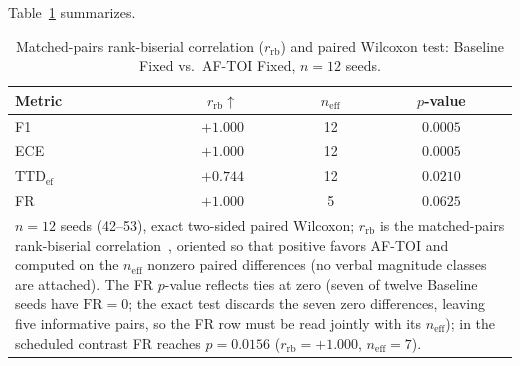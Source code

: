 \documentclass[a4paper,fleqn]{cas-dc}
\begin{document}
Table~\ref{tab:cliff_delta} summarizes.
\begin{table}[!tbp]
\centering
\caption{{\color{\revcolor}Matched-pairs rank-biserial correlation
($r_{\mathrm{rb}}$)} and paired Wilcoxon test: Baseline Fixed vs.\ \mbox{AF-TOI} Fixed{\color{\revcolor}, $n=12$ seeds}.}
\label{tab:cliff_delta}
\footnotesize
\setlength{\tabcolsep}{5pt}
\renewcommand{\arraystretch}{1.15}
{\color{\revcolor}
\begin{tabular}{l c c c}
\toprule
\textbf{Metric} & \textbf{$r_{\mathrm{rb}}$}$\uparrow$
  & \textbf{$n_{\mathrm{eff}}$} & \textbf{$p$-value} \\
\midrule
F1  & $+1.000$ & 12 & $0.0005$ \\
ECE & $+1.000$ & 12 & $0.0005$ \\
$\mathrm{TTD}_{\mathrm{ef}}$ & $+0.744$ & 12 & $0.0210$ \\
FR  & $+1.000$ & 5 & $0.0625$ \\
\bottomrule
\multicolumn{4}{p{0.94\columnwidth}}{\footnotesize $n=12$ seeds (42--53),
exact two-sided paired Wilcoxon; $r_{\mathrm{rb}}$ is the matched-pairs
rank-biserial correlation~\cite{kerby2014simple}, oriented so that positive
favors \mbox{AF-TOI} and computed on the $n_{\mathrm{eff}}$ nonzero paired
differences (no verbal magnitude classes are attached). The FR $p$-value
reflects ties at zero (seven of twelve Baseline seeds have $\mathrm{FR}=0$;
the exact test discards the seven zero differences, leaving five informative
pairs, so the FR row must be read jointly with its $n_{\mathrm{eff}}$); in
the scheduled contrast FR reaches $p=0.0156$
($r_{\mathrm{rb}}=+1.000$, $n_{\mathrm{eff}}=7$).}
\end{tabular}}
\end{table}
\end{document}
